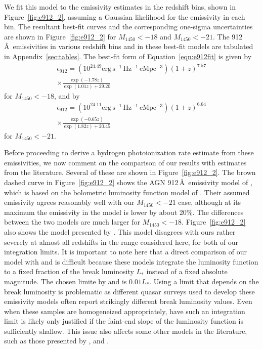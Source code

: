 \documentclass[fleqn,usenatbib]{mnras}
\begin{document}
      We fit this model to the emissivity estimates in the redshift bins,
      shown in Figure~\ref{fig:e912_2}, assuming a Gaussian likelihood for
      the emissivity in each bin.  The resultant best-fit curves and the
      corresponding one-sigma uncertainties are shown in
      Figure~\ref{fig:e912_2} for $M_{1450}<-18$ and $M_{1450}<-21$.  The
      912\,\AA\ emissivities in various redshift bins and in these best-fit
      models are tabulated in Appendix~\ref{sec:tables}.  The best-fit
      form of Equation~\ref{eqn:e912fit} is given by
      \begin{multline}
        \epsilon_{912}=(10^{24.49}\mathrm{erg\, s^{-1}\, Hz^{-1}\, cMpc^{-3}})(1+z)^{7.57}\\\times\frac{\exp(-1.78z)}{\exp(1.01z)+29.20}
      \end{multline}
      for $M_{1450}<-18$, and by 
      \begin{multline}
        \epsilon_{912}=(10^{24.11}\mathrm{erg\, s^{-1}\, Hz^{-1}\, cMpc^{-3}})(1+z)^{6.64}\\\times\frac{\exp(-0.65z)}{\exp(1.82z)+20.45}
      \end{multline}
      for $M_{1450}<-21$.

      Before proceeding to derive a hydrogen photoionization rate estimate
      from these emissivities, we now comment on the comparison of our
      results with estimates from the literature.  Several of these are
      shown in Figure~\ref{fig:e912_2}.  The brown dashed curve in
      Figure~\ref{fig:e912_2} shows the AGN 912\,\AA\ emissivity model of
      \citet{2012ApJ...746..125H}, which is based on the bolometric
      luminosity function model of \citet{2007ApJ...654..731H}.  Their
      assumed emissivity agrees reasonably well with our $M_{1450}<-21$
      case, although at its maximum the emissivity in the
      \citet{2007ApJ...654..731H} model is lower by about 20\%.  The
      differences between the two models are much larger for $M_{1450}<-18$.
      Figure~\ref{fig:e912_2} also shows the model presented by
      \citet{2015ApJ...813L...8M}.  This model disagrees with ours rather
      severely at almost all redshifts in the range considered here, for
      both of our integration limits.  It is important to note here that a
      direct comparison of our model with \citet{2012ApJ...746..125H} and
      \citet{2015ApJ...813L...8M} is difficult because these models
      integrate the luminosity function to a fixed fraction of the break
      luminosity $L_*$ instead of a fixed absolute magnitude.  The chosen
      limite by \citet{2012ApJ...746..125H} and \citet{2015ApJ...813L...8M}
      is $0.01L_*$.  Using a limit that depends on the break luminosity is
      problematic as different quasar surveys used to develop these
      emissivity models often report strikingly different break luminosity
      values.  Even when these samples are homogeneized appropriately, have
      such an integration limit is likely only justified if the faint-end
      slope of the luminosity function is sufficiently shallow.  This issue
      also affects some other models in the literature, such as those
      presented by \citet{2015AA...578A..83G}, \citet{2015MNRAS.451L..30K}
      and \citet{2018arXiv180104931P}.
\end{document}
